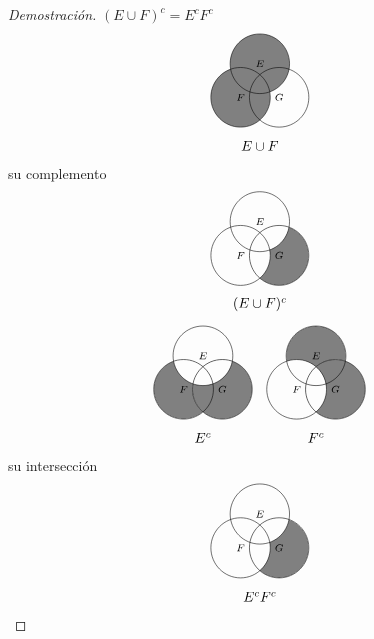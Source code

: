 \begin{enumerate}
    \begin{proof}[Demostración] $(E \cup F)^c = E^cF^c$
        \[
        \begin{tikzpicture}[scale=0.75]
        \fill[fill=black!50] ( 90:.75) circle (1) (210:.75) circle (1);
        \foreach \a/\l in {90/E,210/F,330/G} {
            \path[draw] ++(\a:.75) circle (1) node {$\scriptstyle \l$};
        }
        \node at (0, -2) {$E \cup F$};
        \end{tikzpicture}
        \]
        su complemento
        \[
        \begin{tikzpicture}[scale=0.75]
        \scope[even odd rule]
            \clip ( 90:.75) circle (1) (330:.75) circle (1);
            \clip (210:.75) circle (1) (330:.75) circle (1);
            \fill[fill=black!50] (330:.75) circle (1);
        \endscope
        \foreach \a/\l in {90/E,210/F,330/G} {
            \path[draw] ++(\a:.75) circle (1) node {$\scriptstyle \l$};
        }
        \node at (0, -2) {$(E \cup F)^c$};
        \end{tikzpicture}
        \]
        \[
        \begin{tikzpicture}[scale=0.75]
        \scope[even odd rule]
            \clip (210:.75) circle (1) (330:.75) circle (1);
            \clip ( 90:.75) circle (1) (210:.75) circle (1);
            \fill[fill=black!50] (210:.75) circle (1);
        \endscope
        \scope[even odd rule]
            \clip ( 90:.75) circle (1) (330:.75) circle (1);
            \fill[fill=black!50] (330:.75) circle (1);
        \endscope
        \foreach \a/\l in {90/E,210/F,330/G} {
            \path[draw] ++(\a:.75) circle (1) node {$\scriptstyle \l$};
        }
        \node at (0, -2) {$E^c$};
        \end{tikzpicture}
        \hspace{1em}
        \begin{tikzpicture}[scale=0.75]
        \scope[even odd rule]
            \clip ( 90:.75) circle (1) (210:.75) circle (1);
            \clip (330:.75) circle (1) ( 90:.75) circle (1);
            \fill[fill=black!50] ( 90:.75) circle (1);
        \endscope
        \scope[even odd rule]
            \clip (210:.75) circle (1) (330:.75) circle (1);
            \fill[fill=black!50] (330:.75) circle (1);
        \endscope
        \foreach \a/\l in {90/E,210/F,330/G} {
            \path[draw] ++(\a:.75) circle (1) node {$\scriptstyle \l$};
        }
        \node at (0, -2) {$F^c$};
        \end{tikzpicture}
        \]
        su intersección
        \[
        \begin{tikzpicture}[scale=0.75]
        \scope[even odd rule]
            \clip ( 90:.75) circle (1) (330:.75) circle (1);
            \clip (210:.75) circle (1) (330:.75) circle (1);
            \fill[fill=black!50] (330:.75) circle (1);
        \endscope
        \foreach \a/\l in {90/E,210/F,330/G} {
            \path[draw] ++(\a:.75) circle (1) node {$\scriptstyle \l$};
        }
        \node at (0, -2) {$E^c F^c$};
        \end{tikzpicture}
        \qedhere \]
    \end{proof}
    

\end{enumerate}
